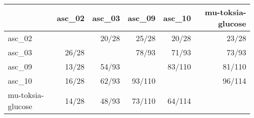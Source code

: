 \begin{tabular}{lrrrrr}
\toprule
 & asc_02 & asc_03 & asc_09 & asc_10 & mu-toksia-glucose \\
\midrule
asc_02 &  & 20/28 & 25/28 & 20/28 & 23/28 \\
asc_03 & 26/28 &  & 78/93 & 71/93 & 73/93 \\
asc_09 & 13/28 & 54/93 &  & 83/110 & 81/110 \\
asc_10 & 16/28 & 62/93 & 93/110 &  & 96/114 \\
mu-toksia-glucose & 14/28 & 48/93 & 73/110 & 64/114 &  \\
\bottomrule
\end{tabular}
